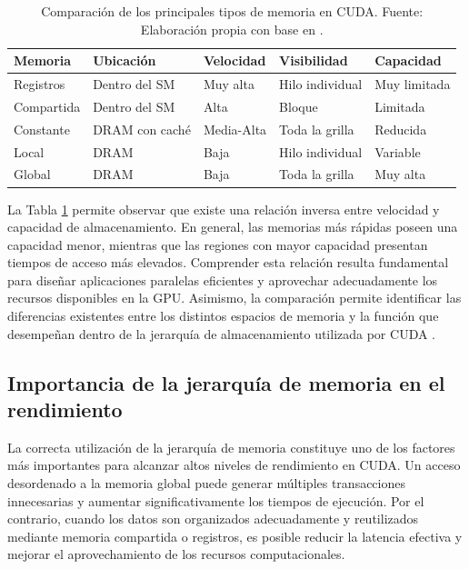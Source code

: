 \begin{table}[H]
\centering
\caption{Comparación de los principales tipos de memoria en CUDA. Fuente: Elaboración propia con base en \cite{cudaMemoryHierarchy,cornellMemory,nvidiaBestPractices}.}
\label{tab:tipos_memoria_cuda}
\begin{tabular}{|>{\raggedright\arraybackslash}p{2.3cm}|>{\raggedright\arraybackslash}p{2.7cm}|>{\raggedright\arraybackslash}p{2.3cm}|>{\raggedright\arraybackslash}p{2.7cm}|>{\raggedright\arraybackslash}p{2.7cm}|}
\hline
\textbf{Memoria} & \textbf{Ubicación} & \textbf{Velocidad} & \textbf{Visibilidad} & \textbf{Capacidad} \\
\hline
Registros & Dentro del SM & Muy alta & Hilo individual & Muy limitada \\
\hline
Compartida & Dentro del SM & Alta & Bloque & Limitada \\
\hline
Constante & DRAM con caché & Media-Alta & Toda la grilla & Reducida \\
\hline
Local & DRAM & Baja & Hilo individual & Variable \\
\hline
Global & DRAM & Baja & Toda la grilla & Muy alta \\
\hline
\end{tabular}
\end{table}

La Tabla \ref{tab:tipos_memoria_cuda} permite observar que existe una relación inversa entre velocidad y capacidad de almacenamiento. En general, las memorias más rápidas poseen una capacidad menor, mientras que las regiones con mayor capacidad presentan tiempos de acceso más elevados. Comprender esta relación resulta fundamental para diseñar aplicaciones paralelas eficientes y aprovechar adecuadamente los recursos disponibles en la GPU. Asimismo, la comparación permite identificar las diferencias existentes entre los distintos espacios de memoria y la función que desempeñan dentro de la jerarquía de almacenamiento utilizada por CUDA \cite{cudaMemoryHierarchy,nvidiaBestPractices}.

\subsection{Importancia de la jerarquía de memoria en el rendimiento}

La correcta utilización de la jerarquía de memoria constituye uno de los factores más importantes para alcanzar altos niveles de rendimiento en CUDA. Un acceso desordenado a la memoria global puede generar múltiples transacciones innecesarias y aumentar significativamente los tiempos de ejecución. Por el contrario, cuando los datos son organizados adecuadamente y reutilizados mediante memoria compartida o registros, es posible reducir la latencia efectiva y mejorar el aprovechamiento de los recursos computacionales.

